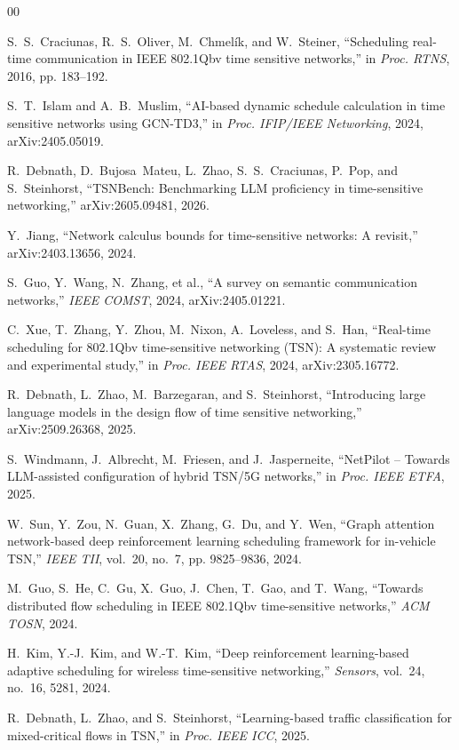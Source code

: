 \documentclass[conference]{IEEEtran}
\begin{document}
\begin{thebibliography}{00}

S.~S.~Craciunas, R.~S.~Oliver, M.~Chmel\'{i}k, and W.~Steiner,
``Scheduling real-time communication in IEEE 802.1Qbv time sensitive networks,''
in \textit{Proc. RTNS}, 2016, pp. 183--192.

S.~T.~Islam and A.~B.~Muslim,
``AI-based dynamic schedule calculation in time sensitive networks using GCN-TD3,''
in \textit{Proc. IFIP/IEEE Networking}, 2024, arXiv:2405.05019.

R.~Debnath, D.~Bujosa~Mateu, L.~Zhao, S.~S.~Craciunas, P.~Pop, and S.~Steinhorst,
``TSNBench: Benchmarking LLM proficiency in time-sensitive networking,''
arXiv:2605.09481, 2026.

Y.~Jiang,
``Network calculus bounds for time-sensitive networks: A revisit,''
arXiv:2403.13656, 2024.

S.~Guo, Y.~Wang, N.~Zhang, et al.,
``A survey on semantic communication networks,''
\textit{IEEE COMST}, 2024, arXiv:2405.01221.

C.~Xue, T.~Zhang, Y.~Zhou, M.~Nixon, A.~Loveless, and S.~Han,
``Real-time scheduling for 802.1Qbv time-sensitive networking (TSN): A systematic review and experimental study,''
in \textit{Proc. IEEE RTAS}, 2024, arXiv:2305.16772.

R.~Debnath, L.~Zhao, M.~Barzegaran, and S.~Steinhorst,
``Introducing large language models in the design flow of time sensitive networking,''
arXiv:2509.26368, 2025.

S.~Windmann, J.~Albrecht, M.~Friesen, and J.~Jasperneite,
``NetPilot -- Towards LLM-assisted configuration of hybrid TSN/5G networks,''
in \textit{Proc. IEEE ETFA}, 2025.

W.~Sun, Y.~Zou, N.~Guan, X.~Zhang, G.~Du, and Y.~Wen,
``Graph attention network-based deep reinforcement learning scheduling framework for in-vehicle TSN,''
\textit{IEEE TII}, vol.~20, no.~7, pp. 9825--9836, 2024.

M.~Guo, S.~He, C.~Gu, X.~Guo, J.~Chen, T.~Gao, and T.~Wang,
``Towards distributed flow scheduling in IEEE 802.1Qbv time-sensitive networks,''
\textit{ACM TOSN}, 2024.

H.~Kim, Y.-J.~Kim, and W.-T.~Kim,
``Deep reinforcement learning-based adaptive scheduling for wireless time-sensitive networking,''
\textit{Sensors}, vol.~24, no.~16, 5281, 2024.

R.~Debnath, L.~Zhao, and S.~Steinhorst,
``Learning-based traffic classification for mixed-critical flows in TSN,''
in \textit{Proc. IEEE ICC}, 2025.

\end{thebibliography}
\end{document}
